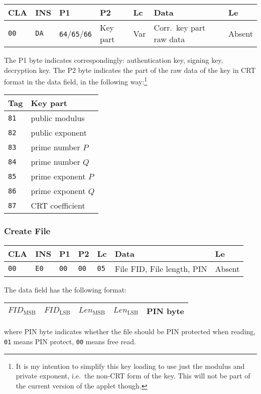 \documentclass{article}
\begin{document}
\begin{flushleft}
\begin{tabular}{|l|l|l|l|l|l|l|}
\hline
CLA & INS & P1 & P2 & Lc & Data & Le \\
\hline
\texttt{00} & \texttt{DA} & \texttt{64}/\texttt{65}/\texttt{66} & Key part &
Var & Corr.\ key part raw data & Absent \\
\hline
\end{tabular}
\end{flushleft}
The P1 byte indicates correspondingly: authentication key, signing
key, decryption key.  The P2 byte indicates the part of the raw data
of the key in CRT format in the data field, in the following
way:\footnote{It is my intention to simplify this key loading to use
  just the modulus and private exponent, i.e.\ the non-CRT form of the
  key. This will not be part of the current version of the applet
  though.}
\begin{flushleft}
\begin{tabular}{|l|l|}
\hline
Tag & Key part \\
\hline
\texttt{81} & public modulus\\
\texttt{82} & public exponent\\
\texttt{83} & prime number $P$\\
\texttt{84} & prime number $Q$\\
\texttt{85} & prime exponent $P$\\
\texttt{86} & prime exponent $Q$\\
\texttt{87} & CRT coefficient\\
\hline
\end{tabular}
\end{flushleft}

\subsubsection{Create File}

\begin{flushleft}
\begin{tabular}{|l|l|l|l|l|l|l|}
\hline
CLA & INS & P1 & P2 & Lc & Data & Le \\
\hline
\texttt{00} & \texttt{E0} & \texttt{00} & \texttt{00} &
\texttt{05} & File FID, File length, PIN  & Absent \\
\hline
\end{tabular}
\end{flushleft}
The data field has the following format:
\begin{flushleft}
\begin{tabular}{|l|l|l|l|l|}
\hline
$\mathit{FID}_{\mathrm{MSB}}$ & $\mathit{FID}_{\mathrm{LSB}}$ &
$\mathit{Len}_{\mathrm{MSB}}$ & $\mathit{Len}_{\mathrm{LSB}}$ &
PIN byte \\
\hline
\end{tabular}
\end{flushleft}
where PIN byte indicates whether the file should be PIN protected when
reading, \texttt{01} means PIN protect, \texttt{00} means free read.
\end{document}
